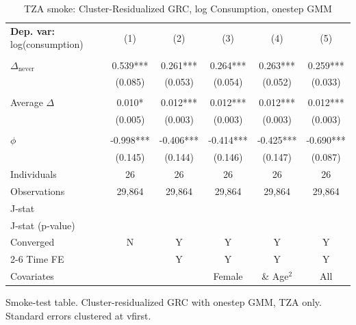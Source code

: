 \begin{table}[htbp] \centering \begin{threeparttable}
 \caption{TZA smoke: Cluster-Residualized GRC, log Consumption, onestep GMM} 
 \label{tab:smoke_verdier_robust_onestep_TZA} 
\begin{tabular}{l ccccc} \toprule  \textbf{Dep. var:}  log(consumption) 
                    &\multicolumn{1}{c}{(1)}   &\multicolumn{1}{c}{(2)}   &\multicolumn{1}{c}{(3)}   &\multicolumn{1}{c}{(4)}   &\multicolumn{1}{c}{(5)}   \\
                    &               &               &               &               &               \\
\addlinespace
$\Delta_{\text{never}}$&       0.539***&       0.261***&       0.264***&       0.263***&       0.259***\\
                    &     (0.085)   &     (0.053)   &     (0.054)   &     (0.052)   &     (0.033)   \\
                    &               &               &               &               &               \\
\addlinespace
Average $\Delta$    &       0.010*  &       0.012***&       0.012***&       0.012***&       0.012***\\
                    &     (0.005)   &     (0.003)   &     (0.003)   &     (0.003)   &     (0.003)   \\
                    &               &               &               &               &               \\
\addlinespace
$\phi$              &      -0.998***&      -0.406***&      -0.414***&      -0.425***&      -0.690***\\
                    &     (0.145)   &     (0.144)   &     (0.146)   &     (0.147)   &     (0.087)   \\
\addlinespace
Individuals         &          26   &          26   &          26   &          26   &          26   \\
Observations        &      29,864   &      29,864   &      29,864   &      29,864   &      29,864   \\
J-stat              &               &               &               &               &               \\
J-stat (p-value)    &               &               &               &               &               \\
Converged           &           N   &           Y   &           Y   &           Y   &           Y   \\
\cmidrule{2-6} Time FE & & Y & Y & Y & Y \\ Covariates & & & Female & \& Age$^2$ & All \\ \bottomrule \end{tabular} \begin{tablenotes}[flushleft] \footnotesize \item{Smoke-test table. Cluster-residualized GRC with onestep GMM, TZA only. Standard errors clustered at vfirst.} \end{tablenotes} \end{threeparttable} \end{table}
